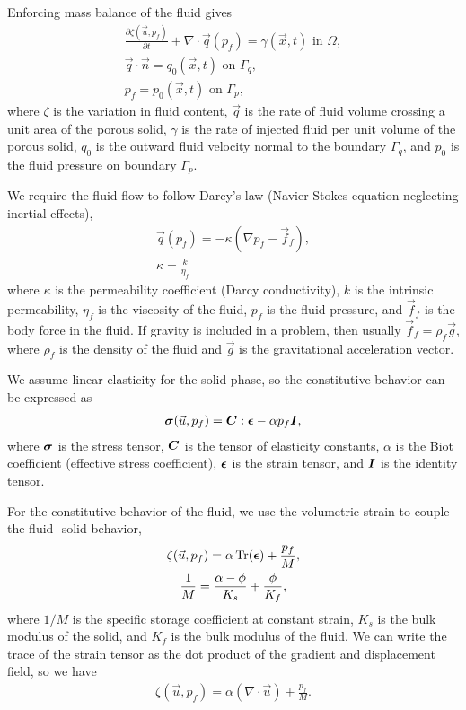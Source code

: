 Enforcing mass balance of the fluid gives
\begin{gather}
  \frac{\partial \zeta(\vec{u},p_f)}{\partial t} + \nabla \cdot \vec{q}(p_f) = 
\gamma(\vec{x},t) \text{ in }
\Omega, \\
%
  \vec{q} \cdot \vec{n} = q_0(\vec{x},t) \text{ on }\Gamma_q, \\
%
  p_f = p_0(\vec{x},t) \text{ on }\Gamma_p,
\end{gather}
where $\zeta$ is the variation in fluid content, $\vec{q}$ is the rate
of fluid volume crossing a unit area of the porous solid, $\gamma$ is
the rate of injected fluid per unit volume of the porous solid, $q_0$
is the outward fluid velocity normal to the boundary $\Gamma_q$, and
$p_0$ is the fluid pressure on boundary $\Gamma_p$.

We require the fluid flow to follow Darcy's law (Navier-Stokes equation neglecting inertial 
effects),
\begin{gather}
  \vec{q}(p_f) = -\kappa (\nabla p_f - \vec{f}_f), \\
%
  \kappa = \frac{k}{\eta_f}
\end{gather}
where $\kappa$ is the permeability coefficient (Darcy conductivity),
$k$ is the intrinsic permeability, $\eta_f$ is the viscosity of the
fluid, $p_f$ is the fluid pressure, and $\vec{f}_f$ is the body force
in the fluid. If gravity is included in a problem, then usually
$\vec{f}_f = \rho_f \vec{g}$, where $\rho_f$ is the density of the
fluid and $\vec{g}$ is the gravitational acceleration vector.

We assume linear elasticity for the solid phase, so the constitutive behavior can be expressed 
as
\begin{gather}
  \bm{\sigma}(\vec{u},p_f) = \bm{C} : \bm{\epsilon} - \alpha p_f \bm{I},
\end{gather}
where $\bm{\sigma}$ is the stress tensor, $\bm{C}$ is the
tensor of elasticity constants, $\alpha$ is the Biot coefficient
(effective stress coefficient), $\bm{\epsilon}$ is the strain
tensor, and $\bm{I}$ is the identity tensor.

For the constitutive behavior of the fluid, we use the volumetric strain to couple the fluid-
solid behavior,
\begin{gather}
  \zeta(\vec{u},p_f) = \alpha \Tr({\tensor{\epsilon}}) + \frac{p_f}{M}, \\
%
  \frac{1}{M} = \frac{\alpha-\phi}{K_s} + \frac{\phi}{K_f},
\end{gather}
where $1/M$ is the specific storage coefficient at constant strain,
$K_s$ is the bulk modulus of the solid, and $K_f$ is the bulk modulus
of the fluid. We can write the trace of the strain tensor as the dot product of the gradient 
and displacement 
field, so we have
\begin{gather}
  \zeta(\vec{u},p_f) = \alpha (\nabla \cdot \vec{u}) + \frac{p_f}{M}.
\end{gather}

